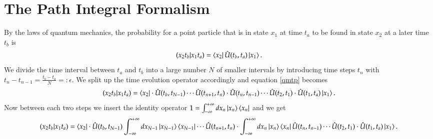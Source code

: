 \section{The Path Integral Formalism}

By the laws of quantum mechanics, the probability for a point particle that is in state $x_1$ at time $t_a$ to be found in state $x_2$ at a later time $t_b$ is
\begin{equation} \label{qmtp}
  (x_2 t_b | x_1 t_a) = \bra{x_2}\hat{U}(t_b,t_a)\ket{x_1}.
\end{equation}
We divide the time interval between $t_a$ and $t_b$ into a large number $N$ of smaller intervals by introducing time steps $t_n$ with $t_n -t_{n-1} = \frac{t_b - t_a}{N} =:\epsilon$. We split up the time evolution operator accordingly and equation \ref{qmtp} becomes
\begin{equation} \label{qmtpn}
  (x_2 t_b | x_1 t_a) = \bra{x_2}\cdot\hat{U}(t_b,t_{N-1}) \cdots \hat{U}(t_{n+1},t_n)\cdot\hat{U}(t_n,t_{n-1}) \cdots \hat{U}(t_2,t_1)\cdot\hat{U}(t_1,t_a)\ket{x_1}.
\end{equation}
Now between each two steps we insert the identity operator $1 = \int_{-\infty}^{+\infty} dx_n \ket{x_n}\bra{x_n}$ and we get 
\begin{equation} \label{tpi}
  (x_2 t_b | x_1 t_a) = \bra{x_2}\cdot\hat{U}(t_b,t_{N-1}) \int_{-\infty}^{+\infty} dx_{N-1} \ket{x_{N-1}}\bra{x_{N-1}} \cdots \hat{U}(t_{n+1},t_n) \cdot \int_{-\infty}^{+\infty} dx_n \ket{x_n}\bra{x_n} \hat{U}(t_n,t_{n-1}) \cdots \hat{U}(t_2,t_1)\cdot\hat{U}(t_1,t_a)\ket{x_1}.
\end{equation}
